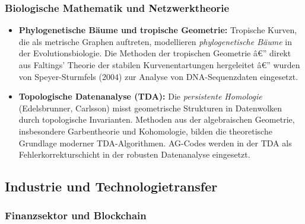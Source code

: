 ﻿\documentclass[12pt,a4paper]{article}
\theoremstyle{plain}
\theoremstyle{definition}
\theoremstyle{remark}
\begin{document}
\subsubsection{Biologische Mathematik und Netzwerktheorie}

\begin{itemize}[leftmargin=2em,itemsep=4pt]
  \item \textbf{Phylogenetische Bäume und tropische Geometrie:}
    Tropische Kurven, die als metrische Graphen auftreten, modellieren
    \emph{phylogenetische Bäume} in der Evolutionsbiologie.
    Die Methoden der tropischen Geometrie â€” direkt aus Faltings' Theorie
    der stabilen Kurvenentartungen hergeleitet â€” wurden von Speyer-Sturmfels (2004)
    zur Analyse von DNA-Sequenzdaten eingesetzt.

  \item \textbf{Topologische Datenanalyse (TDA):}
    Die \emph{persistente Homologie} (Edelsbrunner, Carlsson) misst geometrische
    Strukturen in Datenwolken durch topologische Invarianten. Methoden aus der
    algebraischen Geometrie, insbesondere Garbentheorie und Kohomologie,
    bilden die theoretische Grundlage moderner TDA-Algorithmen.
    AG-Codes werden in der TDA als Fehlerkorrekturschicht in der
    robusten Datenanalyse eingesetzt.
\end{itemize}

\subsection{Industrie und Technologietransfer}

\subsubsection{Finanzsektor und Blockchain}
\end{document}
